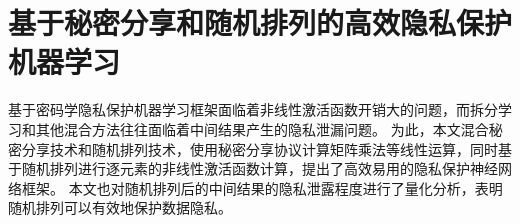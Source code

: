 \chapter{基于秘密分享和随机排列的高效隐私保护机器学习}
基于密码学隐私保护机器学习框架面临着非线性激活函数开销大的问题，而拆分学习和其他混合方法往往面临着中间结果产生的隐私泄漏问题。
%
为此，本文混合秘密分享技术和随机排列技术，使用秘密分享协议计算矩阵乘法等线性运算，同时基于随机排列进行逐元素的非线性激活函数计算，提出了高效易用的隐私保护神经网络框架。
%
本文也对随机排列后的中间结果的隐私泄露程度进行了量化分析，表明随机排列可以有效地保护数据隐私。
%


\label{chap:ss-perm}





